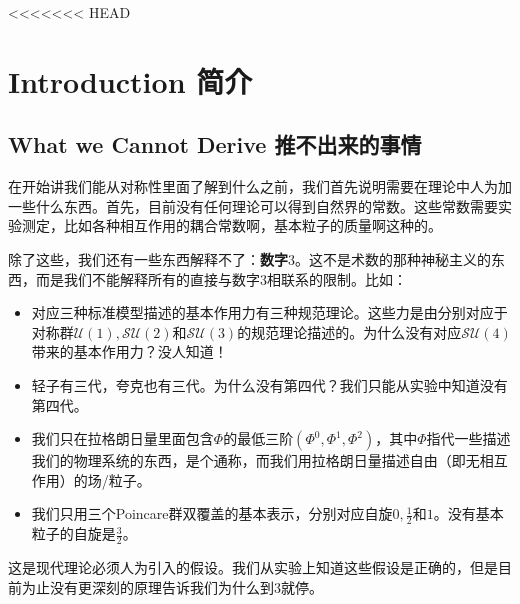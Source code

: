 <<<<<<< HEAD



\chapter[简介]{Introduction 简介}\label{chap1}

\section[推不出来的事情]{What we Cannot Derive 推不出来的事情}\label{sec1.1}

在开始讲我们能从对称性里面了解到什么之前，我们首先说明需要在理论中人为加一些什么东西。首先，目前没有任何理论可以得到自然界的常数。这些常数需要实验测定，比如各种相互作用的耦合常数啊，基本粒子的质量啊这种的。

除了这些，我们还有一些东西解释不了：{\bf 数字$3$}。这不是术数的那种神秘主义的东西，而是我们不能解释所有的直接与数字$3$相联系的限制。比如：

\begin{itemize}
\item 对应三种标准模型描述的基本作用力有三种规范理论。这些力是由分别对应于对称群$\mathcal{U}(1), \mathcal{SU}(2)$和$\mathcal{SU}(3)$的规范理论描述的。为什么没有对应$\mathcal{SU}(4)$带来的基本作用力？没人知道！
\item 轻子有三代，夸克也有三代。为什么没有第四代？我们只能从实验中知道没有第四代。
\item 我们只在拉格朗日量里面包含$\Phi$的最低三阶$(\Phi^0, \Phi^1, \Phi^2)$，其中$\Phi$指代一些描述我们的物理系统的东西，是个通称，而我们用拉格朗日量描述自由（即无相互作用）的场/粒子。
\item 我们只用三个Poincare群双覆盖的基本表示，分别对应自旋$0, \tfrac{1}{2}$和$1$。没有基本粒子的自旋是$\tfrac{3}{2}$。
\end{itemize}

这是现代理论必须人为引入的假设。我们从实验上知道这些假设是正确的，但是目前为止没有更深刻的原理告诉我们为什么到$3$就停。

